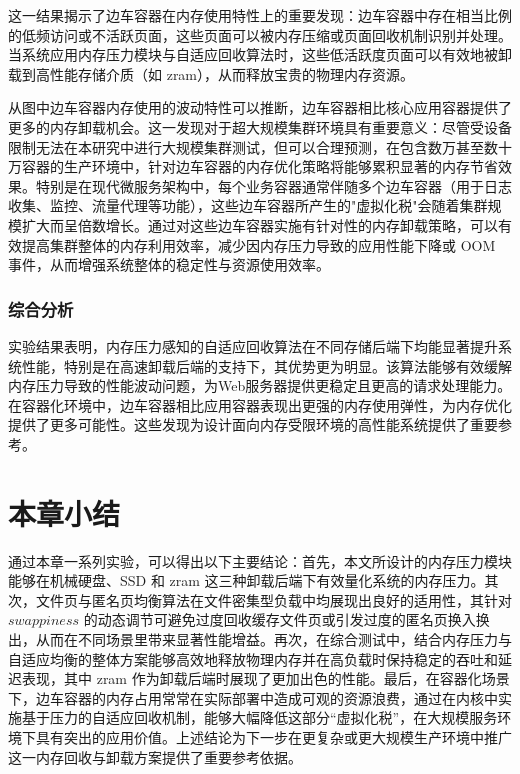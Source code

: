 这一结果揭示了边车容器在内存使用特性上的重要发现：边车容器中存在相当比例的低频访问或不活跃页面，这些页面可以被内存压缩或页面回收机制识别并处理。当系统应用内存压力模块与自适应回收算法时，这些低活跃度页面可以有效地被卸载到高性能存储介质（如 zram），从而释放宝贵的物理内存资源。

从图中边车容器内存使用的波动特性可以推断，边车容器相比核心应用容器提供了更多的内存卸载机会。这一发现对于超大规模集群环境具有重要意义：尽管受设备限制无法在本研究中进行大规模集群测试，但可以合理预测，在包含数万甚至数十万容器的生产环境中，针对边车容器的内存优化策略将能够累积显著的内存节省效果。特别是在现代微服务架构中，每个业务容器通常伴随多个边车容器（用于日志收集、监控、流量代理等功能），这些边车容器所产生的"虚拟化税"会随着集群规模扩大而呈倍数增长。通过对这些边车容器实施有针对性的内存卸载策略，可以有效提高集群整体的内存利用效率，减少因内存压力导致的应用性能下降或 OOM 事件，从而增强系统整体的稳定性与资源使用效率。

\subsubsection{综合分析}
实验结果表明，内存压力感知的自适应回收算法在不同存储后端下均能显著提升系统性能，特别是在高速卸载后端的支持下，其优势更为明显。该算法能够有效缓解内存压力导致的性能波动问题，为Web服务器提供更稳定且更高的请求处理能力。在容器化环境中，边车容器相比应用容器表现出更强的内存使用弹性，为内存优化提供了更多可能性。这些发现为设计面向内存受限环境的高性能系统提供了重要参考。


\section{本章小结}

通过本章一系列实验，可以得出以下主要结论：首先，本文所设计的内存压力模块能够在机械硬盘、SSD 和 zram 这三种卸载后端下有效量化系统的内存压力。其次，文件页与匿名页均衡算法在文件密集型负载中均展现出良好的适用性，其针对 \(swappiness\)  的动态调节可避免过度回收缓存文件页或引发过度的匿名页换入换出，从而在不同场景里带来显著性能增益。再次，在综合测试中，结合内存压力与自适应均衡的整体方案能够高效地释放物理内存并在高负载时保持稳定的吞吐和延迟表现，其中 zram 作为卸载后端时展现了更加出色的性能。最后，在容器化场景下，边车容器的内存占用常常在实际部署中造成可观的资源浪费，通过在内核中实施基于压力的自适应回收机制，能够大幅降低这部分“虚拟化税”，在大规模服务环境下具有突出的应用价值。上述结论为下一步在更复杂或更大规模生产环境中推广这一内存回收与卸载方案提供了重要参考依据。
